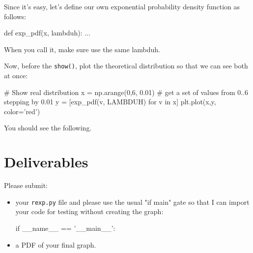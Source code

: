 \begin{fullwidth}
\step Since it's easy, let's define our own exponential probability density function as follows:

\begin{pyverbatim}
def exp_pdf(x, lambduh):
    ...
\end{pyverbatim}

\noindent When you call it, make sure use the same lambduh.

\step Now, before the {\tt show()}, plot the theoretical distribution so that we can see both at once:

\begin{pyverbatim}
# Show real distribution
x = np.arange(0,6, 0.01) # get a set of values from 0..6 stepping by 0.01
y = [exp_pdf(v, LAMBDUH) for v in x]
plt.plot(x,y, color='red')
\end{pyverbatim}

\noindent You should see the following.\\


\section{Deliverables}

Please submit:

\begin{itemize}
\item your {\tt rexp.py} file and please use the usual "if main" gate so that I can import your code for testing without creating the graph:
\begin{pyverbatim}
if __name__ == '__main__':
\end{pyverbatim}

\item a PDF of your final graph.
\end{itemize}

\end{fullwidth}
